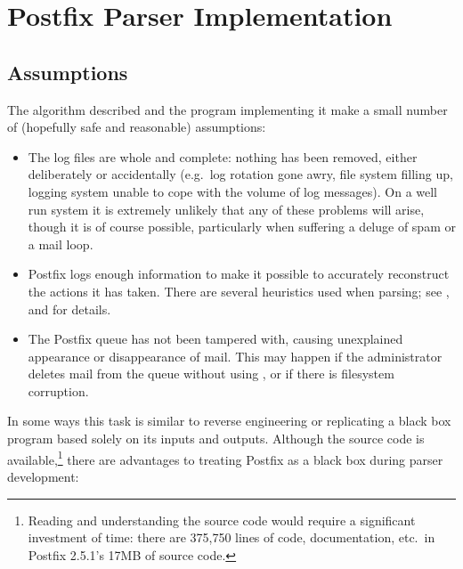 \newpage
\section{Postfix Parser Implementation}

\subsection{Assumptions}

The algorithm described and the program implementing it make a small number
of (hopefully safe and reasonable) assumptions:

\begin{itemize}

    \item The log files are whole and complete: nothing has been removed,
        either deliberately or accidentally (e.g.\ log rotation gone awry,
        file system filling up, logging system unable to cope with the
        volume of log messages).  On a well run system it is extremely
        unlikely that any of these problems will arise, though it is of
        course possible, particularly when suffering a deluge of spam or a
        mail loop.

    \item Postfix logs enough information to make it possible to accurately
        reconstruct the actions it has taken.  There are several heuristics
        used when parsing; see
        ,
         and  for details.

    \item The Postfix queue has not been tampered with, causing unexplained
        appearance or disappearance of mail.  This may happen if the
        administrator deletes mail from the queue without using
        , or if there is filesystem corruption.

\end{itemize}

In some ways this task is similar to reverse engineering or replicating a
black box program based solely on its inputs and outputs.  Although the
source code is available,\footnote{Reading and understanding the source
code would require a significant investment of time: there are 375,750
lines of code, documentation, etc.\ in Postfix 2.5.1's 17MB of source
code.} there are advantages to treating Postfix as a black box during
parser development:

